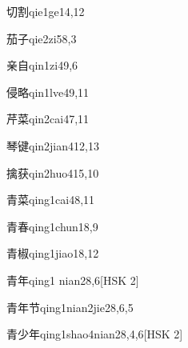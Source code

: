 \begin{entry}{切割}{qie1ge1}{4,12}
\end{entry}

\begin{entry}{茄子}{qie2zi5}{8,3}
\end{entry}

\begin{entry}{亲自}{qin1zi4}{9,6}
\end{entry}

\begin{entry}{侵略}{qin1lve4}{9,11}
\end{entry}

\begin{entry}{芹菜}{qin2cai4}{7,11}
\end{entry}

\begin{entry}{琴键}{qin2jian4}{12,13}
\end{entry}

\begin{entry}{擒获}{qin2huo4}{15,10}
\end{entry}

\begin{entry}{青菜}{qing1cai4}{8,11}
\end{entry}

\begin{entry}{青春}{qing1chun1}{8,9}
\end{entry}

\begin{entry}{青椒}{qing1jiao1}{8,12}
\end{entry}

\begin{entry}{青年}{qing1 nian2}{8,6}[HSK 2]
\end{entry}

\begin{entry}{青年节}{qing1nian2jie2}{8,6,5}
\end{entry}

\begin{entry}{青少年}{qing1shao4nian2}{8,4,6}[HSK 2]
\end{entry}

